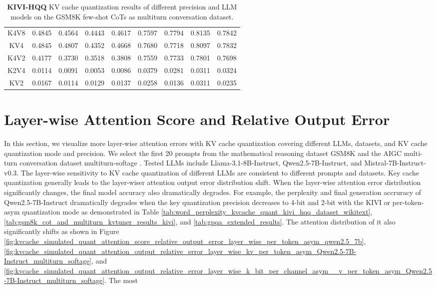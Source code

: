 \begin{table}
{\begin{tabular}{ c | r r r r | r r r r }
K4V8 & 0.4845 & 0.4564 & 0.4443 & \colorbox{blue!30}{0.4617} & 0.7597 & 0.7794 & 0.8135 & 0.7842 \\ 
KV4 & 0.4845 & 0.4807 & 0.4352 & \colorbox{blue!30}{0.4668} &  0.7680 & 0.7718 & 0.8097 & 0.7832 \\ 
K4V2 & 0.4177 & 0.3730 & 0.3518 & \colorbox{blue!30}{0.3808} & 0.7559 & 0.7733 & 0.7801 & 0.7698 \\ 
K2V4 & 0.0114 & 0.0091 & 0.0053 & \colorbox{blue!30}{0.0086} & 0.0379 & 0.0281 & 0.0311 & \colorbox{blue!30}{0.0324} \\ 
KV2  & 0.0167 & 0.0114 & 0.0129 & \colorbox{blue!30}{0.0137} & 0.0258 & 0.0136 & 0.0311 & \colorbox{blue!30}{0.0235}\\ 
\bottomrule
\end{tabular}
}
\caption{\textbf{KIVI-HQQ} KV cache quantization results of different precision and LLM models on the GSM8K few-shot CoTs as multiturn conversation dataset.}
\label{tab:kvcache_quant_results_kivi_gsm8k_cot_as_multiturn}
\end{table}


\section{Layer-wise Attention Score and Relative Output Error}
\label{sec:layer_wise_attention_relative_output_error_appendix}

In this section, we visualize more layer-wise attention errors with KV cache quantization covering different LLMs, datasets, and KV cache quantization mode and precision. We select the first 20 prompts from the mathematical reasoning dataset GSM8K \cite{cobbe2021gsm8k} and the AIGC multi-turn conversation dataset multiturn-softage \cite{SoftAge_AI2024Multi_turn_softage}. Tested LLMs include Llama-3.1-8B-Instruct, Qwen2.5-7B-Instruct, and Mistral-7B-Instruct-v0.3. The layer-wise sensitivity to KV cache quantization of different LLMs are consistent to different prompts and datasets.
Key cache quantization generally leads to the layer-wiser attention output error distribution shift. When the layer-wise attention error distribution significantly changes, the final model accuracy also dramatically degrades. For example, the perplexity and final generation accruracy of Qwen2.5-7B-Instruct dramatically degrades when the key quantization precision decreases to 4-bit and 2-bit with the KIVI or per-token-asym quantization mode as demonstrated in Table \ref{tab:word_perplexity_kvcache_quant_kivi_hqq_dataset_wikitext},  \ref{tab:gsm8k_cot_and_multiturn_kvtuner_results_kivi}, and \ref{tab:gpqa_extended_results}. The attention distribution of it also significantly shifts as shown in Figure \ref{fig:kvcache_simulated_quant_attention_score_relative_output_error_layer_wise_per_token_asym_qwen2.5_7b}, \ref{fig:kvcache_simulated_quant_attention_output_relative_error_layer_wise_kv_per_token_asym_Qwen2.5-7B-Instruct_multiturn_softage}, and \ref{fig:kvcache_simulated_quant_attention_output_relative_error_layer_wise_k_bit_per_channel_asym__v_per_token_asym_Qwen2.5-7B-Instruct_multiturn_softage}. The most 

